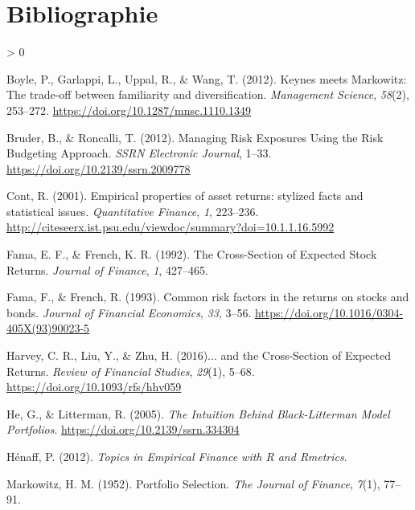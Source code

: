 \documentclass[
  11pt,
]{article}
\newlength{\cslhangindent}
\newenvironment{CSLReferences}[2] %
 {%
  \setlength{\parindent}{0pt}
  \ifodd #1 \everypar{\setlength{\hangindent}{\cslhangindent}}\ignorespaces\fi
  \ifnum #2 > 0
  \setlength{\parskip}{#2\baselineskip}
  \fi
 }%
 {}
\begin{document}
\hypertarget{bibliographie}{%
\section*{Bibliographie}\label{bibliographie}}

\hypertarget{refs}{}
\begin{CSLReferences}{1}{0}
\leavevmode\hypertarget{ref-Boyle2012}{}%
Boyle, P., Garlappi, L., Uppal, R., \& Wang, T. (2012). {Keynes meets
Markowitz: The trade-off between familiarity and diversification}.
\emph{Management Science}, \emph{58}(2), 253--272.
\url{https://doi.org/10.1287/mnsc.1110.1349}

\leavevmode\hypertarget{ref-Bruder2012}{}%
Bruder, B., \& Roncalli, T. (2012). {Managing Risk Exposures Using the
Risk Budgeting Approach}. \emph{SSRN Electronic Journal}, 1--33.
\url{https://doi.org/10.2139/ssrn.2009778}

\leavevmode\hypertarget{ref-Cont2001}{}%
Cont, R. (2001). {Empirical properties of asset returns: stylized facts
and statistical issues}. \emph{Quantitative Finance}, \emph{1},
223--236.
\url{http://citeseerx.ist.psu.edu/viewdoc/summary?doi=10.1.1.16.5992}

\leavevmode\hypertarget{ref-Fama1992}{}%
Fama, E. F., \& French, K. R. (1992). {The Cross-Section of Expected
Stock Returns}. \emph{Journal of Finance}, \emph{1}, 427--465.

\leavevmode\hypertarget{ref-Fama1993}{}%
Fama, F., \& French, R. (1993). {Common risk factors in the returns on
stocks and bonds}. \emph{Journal of Financial Economics}, \emph{33},
3--56. \url{https://doi.org/10.1016/0304-405X(93)90023-5}

\leavevmode\hypertarget{ref-Harvey2016a}{}%
Harvey, C. R., Liu, Y., \& Zhu, H. (2016){... and the Cross-Section of
Expected Returns}. \emph{Review of Financial Studies}, \emph{29}(1),
5--68. \url{https://doi.org/10.1093/rfs/hhv059}

\leavevmode\hypertarget{ref-He2005}{}%
He, G., \& Litterman, R. (2005). \emph{{The Intuition Behind
Black-Litterman Model Portfolios}}.
\url{https://doi.org/10.2139/ssrn.334304}

\leavevmode\hypertarget{ref-Henaff2012}{}%
Hénaff, P. (2012). \emph{{Topics in Empirical Finance with R and
Rmetrics}}.

\leavevmode\hypertarget{ref-Markowitz1952}{}%
Markowitz, H. M. (1952). {Portfolio Selection}. \emph{The Journal of
Finance}, \emph{7}(1), 77--91.


\end{CSLReferences}
\end{document}
